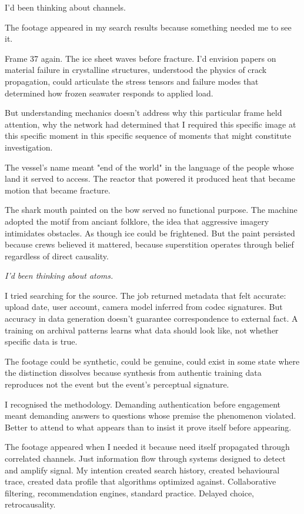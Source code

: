 I'd been thinking about channels.

The footage appeared in my search results because something needed me to see it.

Frame 37 again. The ice sheet waves before fracture. I'd envision papers on material failure in crystalline structures, understood the physics of crack propagation, could articulate the stress tensors and failure modes that determined how frozen seawater responds to applied load. 

But understanding mechanics doesn't address why this particular frame held attention, why the network had determined that I required this specific image at this specific moment in this specific sequence of moments that might constitute investigation.

The vessel's name meant "end of the world" in the language of the people whose land it served to access. The reactor that powered it produced heat that became motion that became fracture.

The shark mouth painted on the bow served no functional purpose. The machine adopted the motif from anciant folklore, the idea that aggressive imagery intimidates obstacles. As though ice could be frightened. But the paint persisted because crews believed it mattered, because superstition operates through belief regardless of direct causality.

\textit{I'd been thinking about atoms.}

I tried searching for the source. The job returned metadata that felt accurate: upload date, user account, camera model inferred from codec signatures. But accuracy in data generation doesn't guarantee correspondence to external fact. A training on archival patterns learns what data should look like, not whether specific data is true. 


The footage could be synthetic, could be genuine, could exist in some state where the distinction dissolves because synthesis from authentic training data reproduces not the event but the event's perceptual signature.

I recognised the methodology. Demanding authentication before engagement meant demanding answers to questions whose premise the phenomenon violated. Better to attend to what appears than to insist it prove itself before appearing.

The footage appeared when I needed it because need itself propagated through correlated channels. Just information flow through systems designed to detect and amplify signal. My intention created search history, created behavioural trace, created data profile that algorithms optimized against. Collaborative filtering, recommendation engines, standard practice. Delayed choice, retrocausality.

